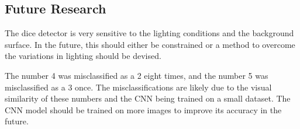 \documentclass[conference]{IEEEtran}
\begin{document}
\subsection{Future Research}

The dice detector is very sensitive to the lighting conditions and the background surface.
In the future, this should either be constrained or a method to overcome the variations in lighting should be devised.

The number 4 was misclassified as a 2 eight times, and the number 5 was misclassified as a 3 once.
The misclassifications are likely due to the visual similarity of these numbers and the CNN being trained on a small dataset. 
The CNN model should be trained on more images to improve its accuracy in the future.

\printbibliography
\end{document}

